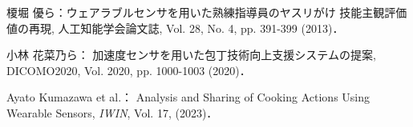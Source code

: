 \documentclass{jarticle}
\begin{document}

% 



\begin{thebibliography}{9}
    
    榎堀 優ら：ウェアラブルセンサを用いた熟練指導員のヤスリがけ
    技能主観評価値の再現, 人工知能学会論文誌, Vol. 28, No. 4, pp. 391-399 (2013)．
    
    
    小林 花菜乃ら：
    加速度センサを用いた包丁技術向上支援システムの提案, DICOMO2020, Vol. 2020, pp. 1000-1003 (2020)．
    
    
    
    Ayato Kumazawa et al.：
    Analysis and Sharing of Cooking Actions Using Wearable Sensors, 
    \textit{IWIN}, Vol. 17, (2023)．
     

\end{thebibliography}
\end{document}
